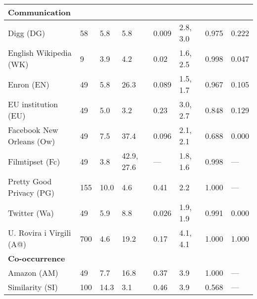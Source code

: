 \begin{longtable}{ llllllll }
\hline
\multicolumn{8}{|l|}{\textbf{Communication}} \\
\hline
Digg (\textsf{DG})                & 58 & 5.8 & 5.8 & 0.009 & 2.8, 3.0 & 0.975 & 0.222 \\
English Wikipedia (\textsf{WK})   & 9 & 3.9 & 4.2 & 0.02 & 1.6, 2.5 & 0.998 & 0.047 \\
Enron (\textsf{EN})               & 49 & 5.8 & 26.3 & 0.089 & 1.5, 1.7 & 0.967 & 0.105 \\
EU institution (\textsf{EU})      & 49 & 5.0 & 3.2 & 0.23 & 3.0, 2.7 & 0.848 & 0.129 \\
Facebook New Orleans (\textsf{Ow}) & 49 & 7.5 & 37.4 & 0.096 & 2.1, 2.1 & 0.688 & 0.000 \\
Filmtipset (\textsf{Fc})          & 49 & 3.8 & 42.9, 27.6 & --- & 1.8, 1.6 & 0.998 & --- \\
Pretty Good Privacy (\textsf{PG}) & 155 & 10.0 & 4.6 & 0.41 & 2.2 & 1.000 & --- \\
Twitter (\textsf{Wa})             & 49 & 5.9 & 8.8 & 0.026 & 1.9, 1.9 & 0.991 & 0.000 \\
U. Rovira i Virgili (\textsf{A@}) & 700 & 4.6 & 19.2 & 0.17 & 4.1, 4.1 & 1.000 & 1.000 \\

\hline
\multicolumn{8}{|l|}{\textbf{Co-occurrence}} \\
\hline
Amazon (\textsf{AM})              & 49 & 7.7 & 16.8 & 0.37 & 3.9 & 1.000 & --- \\
Similarity (\textsf{SI})          & 100 & 14.3 & 3.1 & 0.46 & 3.9 & 0.568 & --- \\


\end{longtable}
